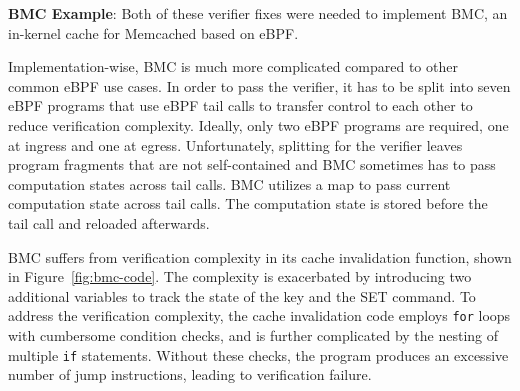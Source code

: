 \noindent\textbf{BMC Example}:
Both of these verifier fixes were needed to implement BMC, an in-kernel cache for Memcached
    based on eBPF.

Implementation-wise, BMC is much more complicated
    compared to other common eBPF use cases.
In order to pass the verifier, it has to be split into seven
    eBPF programs that use eBPF tail calls to transfer control to each other to
    reduce verification complexity.
Ideally, only two eBPF programs are required, one at ingress and one at egress.
Unfortunately, splitting for the verifier leaves program fragments that are not self-contained and
    BMC sometimes has to pass computation states across tail calls.
BMC utilizes a map to pass current computation state across tail calls.
The computation state is stored before the tail call and reloaded afterwards.

BMC suffers from verification complexity in its cache
    invalidation function, shown in Figure~\ref{fig:bmc-code}.
The complexity is exacerbated by introducing two additional variables to track
    the state of the key and the SET command.
To address the verification complexity,
    the cache invalidation code employs \texttt{for} loops with cumbersome
    condition checks, and is further complicated by the nesting of multiple
    \texttt{if} statements.
Without these checks, the program produces an excessive number of jump instructions,
    leading to verification failure.


